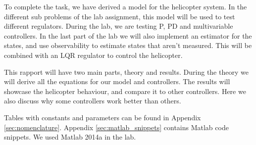 To complete the task, we have derived a model for the helicopter system. In the different sub problems of the lab assignment, this model will be used to test different regulators. During the lab, we are testing P, PD and multivariable controllers. In the last part of the lab we will also implement an estimator for the states, and use observability to estimate states that aren't measured. This will be combined with an LQR regulator to control the helicopter. \medskip

This rapport will have two main parts, theory and results. During the theory we will derive all the equations for our model and controllers. The results will showcase the helicopter behaviour, and compare it to other controllers. Here we also discuss why some controllers work better than others.\medskip

Tables with constants and parameters can be found in Appendix \ref{sec:nomenclature}. Appendix \ref{sec:matlab_snippets} contains Matlab code snippets. We used Matlab 2014a in the lab.